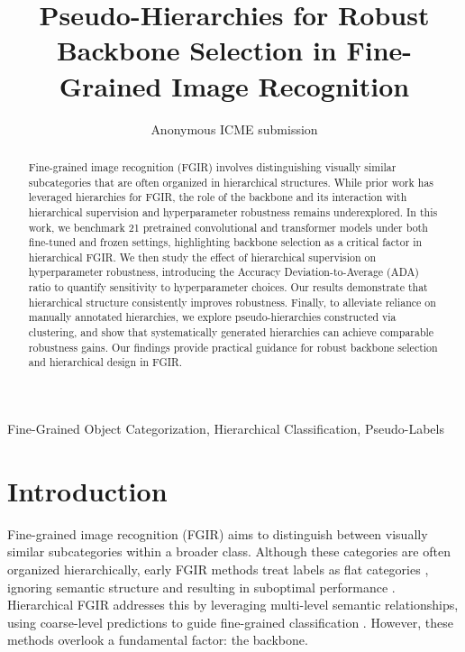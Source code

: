 \documentclass[conference]{IEEEtran}
\begin{document}
\title{Pseudo-Hierarchies for Robust Backbone Selection in Fine-Grained Image Recognition}

\author{Anonymous ICME submission}

\maketitle

\begin{abstract}

Fine-grained image recognition (FGIR) involves distinguishing visually similar subcategories that are often organized in hierarchical structures. While prior work has leveraged hierarchies for FGIR, the role of the backbone and its interaction with hierarchical supervision and hyperparameter robustness remains underexplored. In this work, we benchmark 21 pretrained convolutional and transformer models under both fine-tuned and frozen settings, highlighting backbone selection as a critical factor in hierarchical FGIR. We then study the effect of hierarchical supervision on hyperparameter robustness, introducing the Accuracy Deviation-to-Average (ADA) ratio to quantify sensitivity to hyperparameter choices. Our results demonstrate that hierarchical structure consistently improves robustness. Finally, to alleviate reliance on manually annotated hierarchies, we explore pseudo-hierarchies constructed via clustering, and show that systematically generated hierarchies can achieve comparable robustness gains. Our findings provide practical guidance for robust backbone selection and hierarchical design in FGIR.

\end{abstract}

\begin{IEEEkeywords}
Fine-Grained Object Categorization, Hierarchical Classification, Pseudo-Labels
\end{IEEEkeywords}

\section{Introduction}
\label{sec:intro}

Fine-grained image recognition (FGIR) aims to distinguish between visually similar subcategories within a broader class. Although these categories are often organized hierarchically, early FGIR methods treat labels as flat categories \cite{zhang_part-based_2014, zheng_learning_2017}, ignoring semantic structure and resulting in suboptimal performance \cite{chen_fine-grained_2018}. Hierarchical FGIR addresses this by leveraging multi-level semantic relationships, using coarse-level predictions to guide fine-grained classification \cite{chen_fine-grained_2018, chang_your_2021}. However, these methods overlook a fundamental factor: the backbone.
\end{document}
